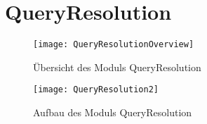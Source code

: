 
\section{QueryResolution}

\begin{figure}[htb]
    	\centering
  	\texttt{[image: QueryResolutionOverview]}
  	\caption{Übersicht des Moduls QueryResolution}
	\label{fig:Übersicht des Moduls QueryResolution}
\end{figure}

\begin{figure}[htb]
    	\centering
  	\texttt{[image: QueryResolution2]}
  	\caption{Aufbau des Moduls QueryResolution}
	\label{fig:Aufbau des Moduls QueryResolution}
\end{figure}


\newpage

\newpage

\newpage




